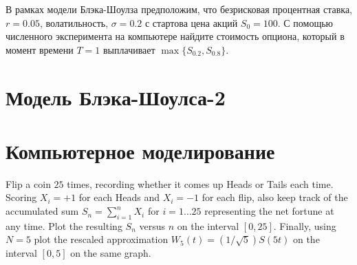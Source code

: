 \begin{problem}
В рамках модели Блэка-Шоулза предположим, что безрисковая процентная ставка, $r=0.05$, волатильность, $\sigma=0.2$ с стартова цена акций $S_0=100$. С помощью численного эксперимента на компьютере найдите стоимость опциона, который в момент времени $T=1$ выплачивает $\max\{ S_{0.2},S_{0.8}\}$. 
\end{problem} 
\begin{solution} 
\end{solution}


\section{Модель Блэка-Шоулса-2}


\section{Компьютерное моделирование} 

\begin{problem}
  Flip a coin $25$ times, recording whether it comes up Heads  or Tails each time.  Scoring $X_i = +1$ for each Heads and $X_i = -1$ for each flip, also keep track of the accumulated sum $S_n = \sum_{i=1}^n X_i$ for $i = 1 \dots 25$ representing the net fortune at any time.  Plot the resulting $S_n$ versus $n$ on the interval   $[0,25]$.  Finally, using $N=5$ plot the rescaled approximation  $W_5(t) = (1/\sqrt{5}) S(5t)$ on the interval $[0,5]$ on the same graph. 
\end{problem} 
\begin{solution} 
\end{solution}



